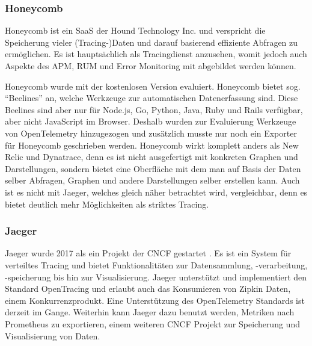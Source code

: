 \subsubsection{Honeycomb}

Honeycomb \cite{Honeycomb} ist ein SaaS der Hound Technology Inc. und verspricht die Speicherung vieler (Tracing-)Daten und darauf basierend effiziente Abfragen zu ermöglichen. Es ist hauptsächlich als Tracingdienst anzusehen, womit jedoch auch Aspekte des APM, RUM und Error Monitoring mit abgebildet werden können.

Honeycomb wurde mit der kostenlosen Version evaluiert. Honeycomb bietet sog. \enquote{Beelines} an, welche Werkzeuge zur automatischen Datenerfassung sind. Diese Beelines sind aber nur für Node.js, Go, Python, Java, Ruby und Rails verfügbar, aber nicht JavaScript im Browser. Deshalb wurden zur Evaluierung Werkzeuge von OpenTelemetry hinzugezogen und zusätzlich musste nur noch ein Exporter für Honeycomb geschrieben werden. Honeycomb wirkt komplett anders als New Relic und Dynatrace, denn es ist nicht ausgefertigt mit konkreten Graphen und Darstellungen, sondern bietet eine Oberfläche mit dem man auf Basis der Daten selber Abfragen, Graphen und andere Darstellungen selber erstellen kann. Auch ist es nicht mit Jaeger, welches gleich näher betrachtet wird, vergleichbar, denn es bietet deutlich mehr Möglichkeiten als striktes Tracing.

\subsubsection{Jaeger}

Jaeger wurde 2017 als ein Projekt der CNCF gestartet \cite{Jaeger}. Es ist ein System für verteiltes Tracing und bietet Funktionalitäten zur Datensammlung, -verarbeitung, -speicherung bis hin zur Visualisierung. Jaeger unterstützt und implementiert den Standard OpenTracing und erlaubt auch das Konsumieren von Zipkin Daten, einem Konkurrenzprodukt. Eine Unterstützung des OpenTelemetry Standards ist derzeit im Gange. Weiterhin kann Jaeger dazu benutzt werden, Metriken nach Prometheus \cite{Prometheus} zu exportieren, einem weiteren CNCF Projekt zur Speicherung und Visualisierung von Daten.


